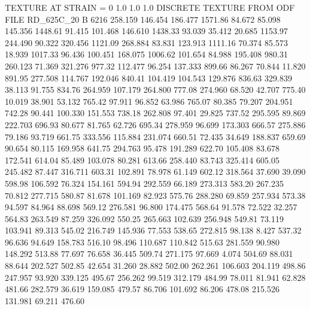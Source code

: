 TEXTURE AT STRAIN = 0
1.0   1.0   1.0
DISCRETE TEXTURE FROM ODF FILE RD_625C_20
B 6216
 258.159  146.454  186.477      1571.86
  84.672   85.098  145.356      1448.61
  91.415  101.468  146.610      1438.33
  93.039   35.412   20.685      1153.97
 244.490   90.322  320.456      1121.09
 268.884   83.831  123.913      1111.16
  70.374   85.573   18.939      1017.33
  96.436  100.451  168.075      1006.62
 101.654   84.988  195.408       980.31
 260.123   71.369  321.276       977.32
 112.477   96.254  137.333       899.66
  86.267   70.844   11.820       891.95
 277.508  114.767  192.046       840.41
 104.419  104.543  129.876       836.63
 329.839   38.113   91.755       834.76
 264.959  107.179  264.800       777.08
 274.960   68.520   42.707       775.40
  10.019   38.901   53.132       765.42
  97.911   96.852   63.986       765.07
  80.385   79.207  204.951       742.28
  90.441  100.330  151.553       738.18
 262.808   97.401   29.825       737.52
 295.595   89.869  222.703       696.93
  80.677   81.765   62.726       695.34
 278.959   96.699  173.303       666.57
 275.886   79.186   93.719       661.75
 333.556  115.884  231.074       660.51
  72.435   34.649  188.837       659.69
  90.654   80.115  169.958       641.75
 294.763   95.478  191.289       622.70
 105.408   83.678  172.541       614.04
  85.489  103.078   80.281       613.66
 258.440   83.743  325.414       605.05
 245.482   87.447  316.711       603.31
 102.891   78.978   61.149       602.12
 318.564   37.690   39.090       598.98
 106.592   76.324  154.161       594.94
 292.559   66.189  273.313       583.20
 267.235   70.812  277.715       580.87
  81.678  101.169   82.923       575.76
 288.280   69.859  257.934       573.38
  94.597   84.964   88.698       569.12
 276.581   96.800  174.475       568.64
  91.578   72.522   32.257       564.83
 263.549   87.259  326.092       550.25
 265.663  102.639  256.948       549.81
  73.119  103.941   89.313       545.02
 216.749  145.936   77.553       538.65
 272.815   98.138    8.427       537.32
  96.636   94.649  158.783       516.10
  98.496  110.687  110.842       515.63
 281.559   90.980  148.292       513.88
  77.697   76.658   36.445       509.74
 271.175   97.669    4.074       504.69
  88.031   88.644  202.527       502.85
  42.654   31.260   28.882       502.00
 262.261  106.603  204.119       498.86
 247.957   93.920  339.125       495.67
 256.262   99.519  312.179       484.99
  78.011   81.941   62.828       481.66
 282.579   36.619  159.085       479.57
  86.706  101.692   86.206       478.08
 215.526  131.981   69.211       476.60
